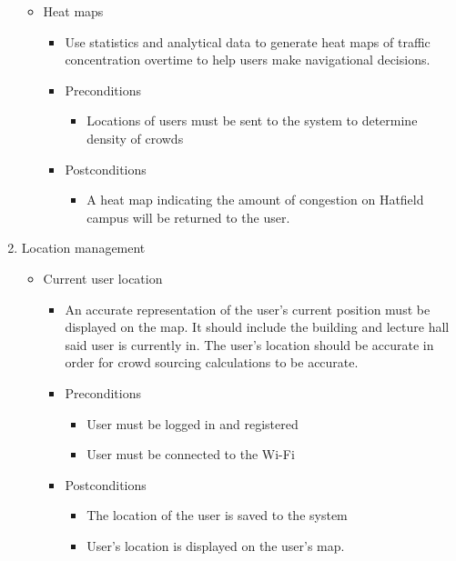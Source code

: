 \documentclass[12pt]{article}
\begin{document}
\begin{enumerate}
\begin{itemize}
				\item Heat maps
				\begin{itemize}
					\item Use statistics and analytical data to generate heat maps of traffic concentration overtime to help users make navigational decisions.
					\item Preconditions
					\begin{itemize}
						\item Locations of users must be sent to the system to determine density of crowds
					\end{itemize}
					\item Postconditions
					\begin{itemize}
						\item A heat map indicating the amount of congestion on Hatfield campus will be returned to the user.
					\end{itemize}
				\end{itemize}
			\end{itemize}	
			
			\item Location management
			\begin{itemize}
				\item Current user location
				\begin{itemize}
					\item An accurate representation of the user’s current position must be displayed on the map. It should include the building and lecture hall said user is currently in. The user’s location should be accurate in order for crowd sourcing calculations to be accurate.
					\item Preconditions
					\begin{itemize}
						\item User must be logged in and registered
						\item User must be connected to the Wi-Fi
					\end{itemize}
					\item Postconditions
					\begin{itemize}
						\item The location of the user is saved to the system 
						\item User’s location is displayed on the user’s map.
					\end{itemize}
				\end{itemize}				
				

\end{itemize}
\end{enumerate}
\end{document}
